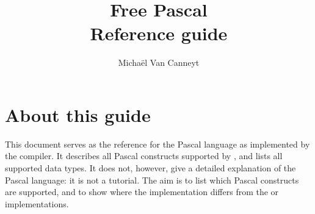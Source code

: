 %
%
%
%
%

\begin{latexonly}
  \ifpdf
  \fi
\end{latexonly}

%
%
\makeindex
%
%
\usepackage{syntax}

%
%

\title{Free Pascal\\ Reference guide}

\author{Micha\"el Van Canneyt}
\maketitle
\tableofcontents
\newpage
\listoftables
\newpage




\section*{About this guide}
This document serves as the reference for the Pascal language as implemented
by the \fpc compiler. It describes all Pascal constructs supported by 
\fpc, and lists all supported data types. It does not, however, give a 
detailed explanation of the Pascal language: it is not a tutorial. 
The aim is to list which Pascal constructs are supported, and to show 
where the \fpc implementation differs from the \tp or \delphi
implementations. 


